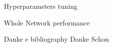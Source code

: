 \documentclass{beamer}
\begin{document}
\begin{frame}{Hyperparameters tuning}

    
\end{frame}


\begin{frame}{Whole Network performance}

    
\end{frame}

\begin{frame}{Danke e bibliography}
\centering
Danke Schon

    
\end{frame}
\end{document}
